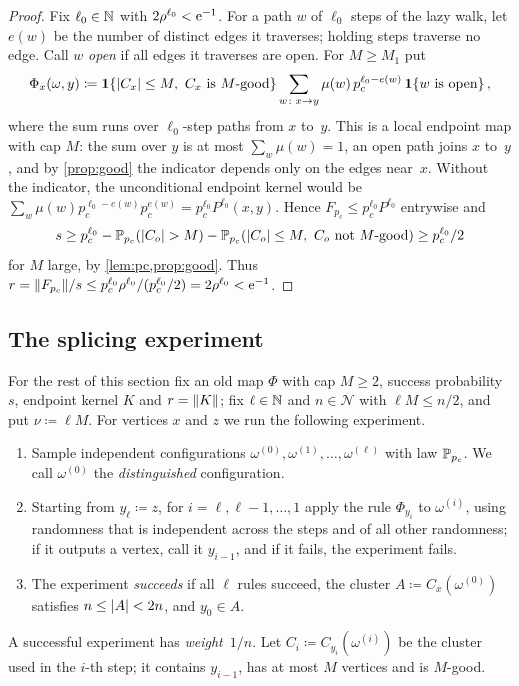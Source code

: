 \begin{proof}
Fix $\ell_0\in\mathbb N$ with $2\rho^{\ell_0}<\mathrm{e}^{-1}$. For a path $w$ of $\ell_0$ steps of the lazy walk, let $e(w)$ be
the number of distinct edges it traverses; holding steps traverse no edge. Call $w$ \emph{open} if all
edges it traverses are open. For $M\ge M_1$ put
\begin{equation*}
  \Phi_x(\omega,y)\coloneqq\1\{\abs{C_x}\le M,\ C_x\text{ is $M$-good}\}
  \sum_{w\colon x\to y}\mu(w)\,p_c^{\ell_0-e(w)}\,\1\{w\text{ is open}\}\,,
\end{equation*}
where the sum runs over $\ell_0$-step paths from $x$ to~$y$. This is a local endpoint map with cap $M$:
the sum over $y$ is at most $\sum_w\mu(w)=1$, an open path joins $x$ to~$y$, and by \cref{prop:good} the
indicator depends only on the edges near~$x$. Without the indicator, the unconditional endpoint
kernel would be $\sum_w\mu(w)p_c^{\ell_0-e(w)}p_c^{e(w)}=p_c^{\ell_0} P^{\ell_0}(x,y)$. Hence $F_{p_c}\le
p_c^{\ell_0} P^{\ell_0}$ entrywise and
\begin{equation*}
  s\ge p_c^{\ell_0}-\PP_{p_c}(\abs{C_o}>M)-\PP_{p_c}(\abs{C_o}\le M,\ C_o\text{ not $M$-good})\ge p_c^{\ell_0}/2
\end{equation*}
for $M$ large, by \cref{lem:pc,prop:good}. Thus $r=\lVert F_{p_c}\rVert/s\le p_c^{\ell_0}\rho^{\ell_0}/(p_c^{\ell_0}/2)
=2\rho^{\ell_0}<\mathrm{e}^{-1}$.
\end{proof}

\subsection{The splicing experiment}\label{sec:splicing}

For the rest of this section fix an old map $\Phi$ with cap $M\ge2$, success probability~$s$, endpoint
kernel $K$ and $r=\lVert K\rVert$; fix $\ell\in\mathbb N$ and $n\in\mathcal N$ with $\ell M\le n/2$, and put
$\nu\coloneqq \ell M$. For vertices $x$ and $z$ we run the following experiment.
\begin{enumerate}[label=(\arabic*)]
  \item Sample independent configurations $\omega^{(0)},\omega^{(1)},\dots,\omega^{(\ell)}$ with law
  $\mathbb P_{p_c}$. We call $\omega^{(0)}$ the \emph{distinguished} configuration.
  \item Starting from $y_\ell\coloneqq z$, for $i=\ell,\ell-1,\dots,1$ apply the rule $\Phi_{y_i}$ to
  $\omega^{(i)}$, using randomness that is independent across the steps and of all other randomness;
  if it outputs a vertex, call it $y_{i-1}$, and if it fails, the experiment fails.
  \item The experiment \emph{succeeds} if all $\ell$ rules succeed, the cluster
  $A\coloneqq C_x(\omega^{(0)})$ satisfies $n\le\lvert A\rvert<2n$, and $y_0\in A$.
\end{enumerate}
A successful experiment has \emph{weight}~$1/n$. Let $C_i\coloneqq C_{y_i}(\omega^{(i)})$ be the cluster
used in the $i$-th step; it contains $y_{i-1}$, has at most $M$ vertices and is $M$-good.

